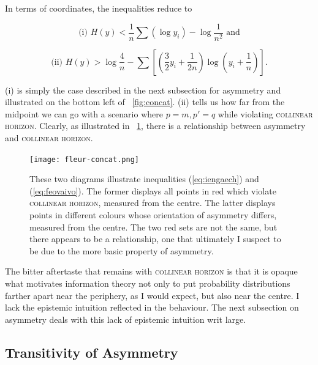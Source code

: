 \documentclass[phd,12pt,oneside]{ubcthesis}
\begin{document}
{\noindent}In terms of coordinates, the inequalities reduce to

\begin{equation}
  \label{eq:iengaech}
\mbox{(i) }H(y)<\frac{1}{n}\sum\left(\log{}y_{i}\right)-\log\frac{1}{n^{2}}\mbox{ and}
\end{equation}

\begin{equation}
  \label{eq:feovaivo}
\mbox{(ii) }H(y)>\log\frac{4}{n}-\sum\left[\left(\frac{3}{2}y_{i}+\frac{1}{2n}\right)\log\left(y_{i}+\frac{1}{n}\right)\right].
\end{equation}

{\noindent}(i) is simply the case described in the next subsection for asymmetry
and illustrated on the bottom left of {\igure}~\ref{fig:concat}. (ii)
tells us how far from the midpoint we can go with a scenario where
$p=m,p'=q$ while violating \textsc{collinear horizon}. Clearly, as
illustrated in {\igure}~\ref{fig:eeghoomo}, there is a relationship
between asymmetry and \textsc{collinear horizon}. 

\begin{figure}[ht!]
    \begin{minipage}[h]{\linewidth}
      \texttt{[image: fleur-concat.png]}
      \caption{\footnotesize These two diagrams illustrate
        inequalities (\ref{eq:iengaech}) and (\ref{eq:feovaivo}). The
        former displays all points in red which violate
        \textsc{collinear horizon}, measured from the centre. The
        latter displays points in different colours whose orientation
        of asymmetry differs, measured from the centre. The two red
        sets are not the same, but there appears to be a relationship,
        one that ultimately I suspect to be due to the more basic
        property of asymmetry.}
      \label{fig:eeghoomo}
    \end{minipage}
\end{figure}

The bitter aftertaste that remains with \textsc{collinear horizon} is
that it is opaque what motivates information theory not only to put
probability distributions farther apart near the periphery, as I would
expect, but also near the centre. I lack the epistemic intuition
reflected in the behaviour. The next subsection on asymmetry deals
with this lack of epistemic intuition writ large.

\subsection{Transitivity of Asymmetry}
\label{subsec:Asymmetry}
\end{document}
